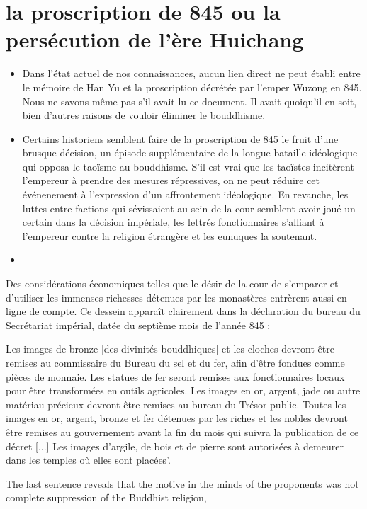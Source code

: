 \section{la proscription de 845 ou la persécution de l'ère Huichang}
\begin{itemize}

\item Dans l'état actuel de nos connaissances, aucun lien direct ne peut établi entre le mémoire de Han Yu et la proscription décrétée par l'emper Wuzong en 845. Nous ne savons même pas s'il avait lu ce document. Il avait quoiqu'il en soit, bien d'autres raisons de vouloir éliminer le bouddhisme.
\item  Certains historiens semblent faire de la proscription de 845 le fruit d'une  brusque décision, un épisode supplémentaire de la longue bataille idéologique qui opposa le taoïsme au bouddhisme. S'il est vrai que les taoïstes incitèrent l'empereur à prendre des mesures répressives, on ne peut réduire cet événenement à l'expression d'un affrontement idéologique. En revanche, les luttes entre factions qui sévissaient au sein de la cour semblent avoir joué un certain dans la décision impériale, les lettrés fonctionnaires s'alliant à l'empereur contre la religion étrangère et les eunuques la soutenant.
    \item 
\end{itemize}
Des considérations économiques telles que le désir de la cour de s'emparer et d'utiliser les immenses richesses détenues par les monastères entrèrent aussi en ligne de compte. Ce dessein apparaît clairement dans la déclaration du bureau du Secrétariat impérial, datée du septième mois de l'année 845 :
\begin{singlequote}
    Les images de bronze [des divinités bouddhiques] et les cloches devront être remises au commissaire du Bureau du sel et du fer, afin d'être fondues comme pièces de monnaie. Les statues de fer seront remises aux fonctionnaires locaux pour être transformées en outils agricoles. Les images en or, argent, jade ou autre matériau précieux devront être remises au bureau du Trésor public. Toutes les images en or, argent, bronze et fer détenues par les riches et les nobles devront être remises au gouvernement avant la fin du mois qui suivra la publication de ce décret [...] Les images d'argile, de bois et de pierre sont autorisées à demeurer dans les temples où elles sont placées'.
\end{singlequote}
The last sentence reveals that the motive in the minds of the
proponents was not complete suppression of the Buddhist religion,
